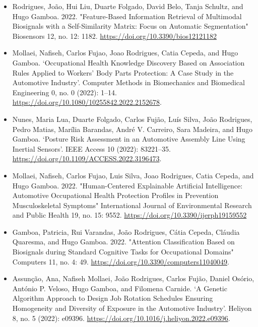 \begin{itemize}

\item Rodrigues, João, Hui Liu, Duarte Folgado, David Belo, Tanja Schultz, and Hugo Gamboa. 2022. "Feature-Based Information Retrieval of Multimodal Biosignals with a Self-Similarity Matrix: Focus on Automatic Segmentation" Biosensors 12, no. 12: 1182. \url{https://doi.org/10.3390/bios12121182}

\item Mollaei, Nafiseh, Carlos Fujao, Joao Rodrigues, Catia Cepeda, and Hugo Gamboa. ‘Occupational Health Knowledge Discovery Based on Association Rules Applied to Workers’ Body Parts Protection: A Case Study in the Automotive Industry’. Computer Methods in Biomechanics and Biomedical Engineering 0, no. 0 (2022): 1–14. \url{https://doi.org/10.1080/10255842.2022.2152678}.

\item Nunes, Maria Lua, Duarte Folgado, Carlos Fujão, Luís Silva, João Rodrigues, Pedro Matias, Marília Barandas, André V. Carreiro, Sara Madeira, and Hugo Gamboa. ‘Posture Risk Assessment in an Automotive Assembly Line Using Inertial Sensors’. IEEE Access 10 (2022): 83221–35. \url{https://doi.org/10.1109/ACCESS.2022.3196473}.

\item Mollaei, Nafiseh, Carlos Fujao, Luis Silva, Joao Rodrigues, Catia Cepeda, and Hugo Gamboa. 2022. "Human-Centered Explainable Artificial Intelligence: Automotive Occupational Health Protection Profiles in Prevention Musculoskeletal Symptoms" International Journal of Environmental Research and Public Health 19, no. 15: 9552. \url{https://doi.org/10.3390/ijerph19159552}

\item Gamboa, Patricia, Rui Varandas, João Rodrigues, Cátia Cepeda, Cláudia Quaresma, and Hugo Gamboa. 2022. "Attention Classification Based on Biosignals during Standard Cognitive Tasks for Occupational Domains" Computers 11, no. 4: 49. \url{https://doi.org/10.3390/computers11040049}.

\item Assunção, Ana, Nafiseh Mollaei, João Rodrigues, Carlos Fujão, Daniel Osório, António P. Veloso, Hugo Gamboa, and Filomena Carnide. ‘A Genetic Algorithm Approach to Design Job Rotation Schedules Ensuring Homogeneity and Diversity of Exposure in the Automotive Industry’. Heliyon 8, no. 5 (2022): e09396. \url{https://doi.org/10.1016/j.heliyon.2022.e09396}.


\end{itemize}
